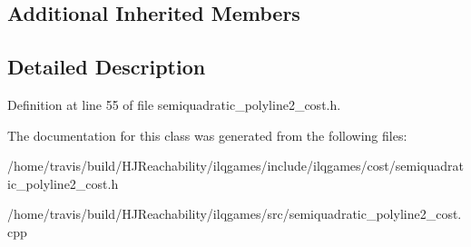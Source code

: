 \subsection*{Additional Inherited Members}


\subsection{Detailed Description}


Definition at line 55 of file semiquadratic\+\_\+polyline2\+\_\+cost.\+h.



The documentation for this class was generated from the following files\+:\begin{DoxyCompactItemize}
\item 
/home/travis/build/\+H\+J\+Reachability/ilqgames/include/ilqgames/cost/semiquadratic\+\_\+polyline2\+\_\+cost.\+h\item 
/home/travis/build/\+H\+J\+Reachability/ilqgames/src/semiquadratic\+\_\+polyline2\+\_\+cost.\+cpp\end{DoxyCompactItemize}
